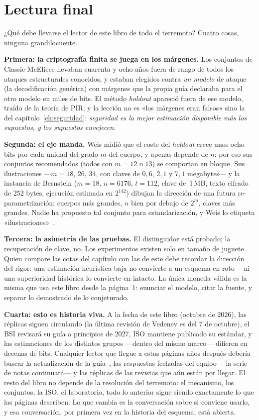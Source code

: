 \documentclass[11pt,a4paper,oneside]{report}
\begin{document}
\section{Lectura final}\label{sec:2026-lectura}

¿Qué debe llevarse el lector de este libro de todo el terremoto?
Cuatro cosas, ninguna grandilocuente.

\textbf{Primera: la criptografía finita se juega en los márgenes.}
Los conjuntos de Classic McEliece llevaban cuarenta y ocho años
fuera de rango de todos los ataques estructurales conocidos, y
estaban elegidos contra \emph{un modelo} de ataque (la
decodificación genérica) con márgenes que la propia guía declaraba
para el otro modelo en miles de bits. El método \emph{holdout}
apareció fuera de ese modelo, traído de la teoría de PIR, y la
lección no es «los márgenes eran falsos» sino la del
capítulo~\ref{ch:seguridad}: \emph{seguridad es la mejor estimación
disponible más los supuestos, y los supuestos envejecen}.

\textbf{Segunda: el eje manda.} Weis midió que el coste del
\emph{holdout} crece unos ocho bits por cada unidad del grado $m$
del cuerpo, y apenas depende de $n$: por eso sus conjuntos
recomendados (todos con $m=12$ o $13$) se comportan en bloque. Sus
ilustraciones ---$m=18$, $26$, $34$, con claves de $0{,}6$, $2{,}1$ y
$7{,}1$ megabytes--- y la instancia de Bernstein ($m=18$,
$n=6176$, $t=112$, clave de~1\,MB, texto cifrado de 252 bytes,
ejecución estimada en $2^{142}$) dibujan la dirección de una
futura re-parametrización: cuerpos más grandes, $n$ bien por debajo
de $2^m$, claves más grandes. Nadie ha propuesto tal conjunto para
estandarización, y Weis lo etiqueta «ilustraciones»~\cite{weis2026}.

\textbf{Tercera: la asimetría de las pruebas.} El distinguidor está
probado; la recuperación de clave, no. Los experimentos existen
solo en tamaño de juguete. Quien compare las cotas del capítulo
con las de este debe recordar la dirección del rigor: una
estimación heurística baja no convierte a un esquema en roto ---ni
una superioridad histórica lo convierte en intacto. La única
moneda válida es la misma que usa este libro desde la
página~1: enunciar el modelo, citar la fuente, y separar lo
demostrado de lo conjeturado.

\textbf{Cuarta: esto es historia viva.} A la fecha de este libro
(octubre de 2026), las réplicas siguen circulando (la última
revisión de Vedenev es del 7 de octubre), el BSI revisará su guía a
principios de 2027, ISO mantiene publicado su estándar, y las
estimaciones de los distintos grupos ---dentro del mismo marco---
difieren en decenas de bits. Cualquier lector que llegue a estas
páginas años después debería buscar la actualización de la
guía~\cite{cmsecurity}, las respuestas fechadas del equipo
---la serie de notas continuará--- y las réplicas de las revistas
que aún están por llegar. El resto del libro no depende de la
resolución del terremoto: el mecanismo, los conjuntos, la ISO, el
laboratorio, todo lo anterior sigue siendo exactamente lo que las
páginas describen. Lo que cambia es la conversación sobre si
conviene usarlo, y esa conversación, por primera vez en la historia
del esquema, está abierta.
\end{document}
